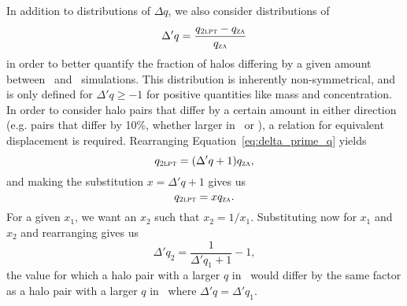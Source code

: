 In addition to distributions of $\Delta q$, we also consider distributions of
\begin{equation} \label{eq:delta_prime_q}
	\Delta' q = \frac{q_{\textsc{2lpt}} - q_{\textsc{za}}}{q_{\textsc{za}}}
\end{equation}
in order to better quantify the fraction of halos differing by a given amount between \lpt\ and \za\ simulations.  This distribution is inherently non-symmetrical, and is only defined for $\Delta' q \geq -1$ for positive quantities like mass and concentration.  In order to consider halo pairs that differ by a certain amount in either direction (e.g. pairs that differ by 10\%, whether larger in \lpt\ or \za), a relation for equivalent displacement is required.  Rearranging Equation~\ref{eq:delta_prime_q} yields
\begin{equation} \label{eq:delta_prime_q_rearranged}
	q_{\textsc{2lpt}} = (\Delta' q + 1) q_{\textsc{za}},
\end{equation}
and making the substitution $x = \Delta' q + 1$ gives us
\begin{equation} \label{eq:delta_prime_q_x_factor}
	q_{\textsc{2lpt}} = x q_{\textsc{za}}.
\end{equation}
For a given $x_{1}$, we want an $x_{2}$ such that $x_{2} = 1 / x_{1}$.  Substituting now for $x_{1}$ and $x_{2}$ and rearranging gives us
\begin{equation} \label{eq:equivalent_q_prime}
	\Delta' q_{2} = \frac{1}{\Delta' q_{1} + 1} - 1,
\end{equation}
the value for which a halo pair with a larger $q$ in \za\ would differ by the same factor as a halo pair with a larger $q$ in \lpt\ where $\Delta' q = \Delta' q_{1}$.



